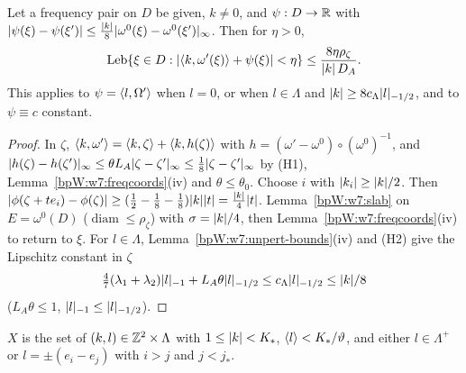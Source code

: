 \begin{lemma}\label{bpW:w7:zone}
Let a frequency pair on $D$ be given, $k\ne0$, and $\psi:D\to\mathbb{R}$ with
$\lvert \psi(\xi)-\psi(\xi')\rvert\le\frac{\lvert k\rvert}8\lvert \omega^0(\xi)-\omega^0(\xi')\rvert_\infty$. Then for $\eta>0$,
\[\operatorname{Leb}\{\xi\in D:\lvert \langle k,\omega'(\xi)\rangle+\psi(\xi)\rvert<\eta\}\le\frac{8\eta\rho_\zeta}{\lvert k\rvert\,D_A}.\]
This applies to $\psi=\langle l,\Omega'\rangle$ when $l=0$, or when $l\in\Lambda$ and $\lvert k\rvert\ge8c_\Lambda\lvert l\rvert_{-1/2}$, and to
$\psi\equiv c$ constant.
\end{lemma}
\begin{proof}
\label{stepW:w7:zone-lower}
In $\zeta$, $\langle k,\omega'\rangle=\langle k,\zeta\rangle+\langle k,h(\zeta)\rangle$ with $h=(\omega'-\omega^0)\circ(\omega^0)^{-1}$, and
$\lvert h(\zeta)-h(\zeta')\rvert_\infty\le\theta L_A\lvert \zeta-\zeta'\rvert_\infty\le\frac18\lvert \zeta-\zeta'\rvert_\infty$ by (H1),
Lemma~\ref{bpW:w7:freqcoords}(iv) and $\theta\le\theta_0$. Choose $i$ with $\lvert k_i\rvert\ge\lvert k\rvert/2$. Then
$\lvert \phi(\zeta+te_i)-\phi(\zeta)\rvert\ge(\frac12-\frac18-\frac18)\lvert k\rvert\lvert t\rvert=\frac{\lvert k\rvert}4\lvert t\rvert$.
\label{stepW:w7:zone-slab}
Lemma~\ref{bpW:w7:slab} on $E=\omega^0(D)$ ($\operatorname{diam}\le\rho_\zeta$) with $\sigma=\lvert k\rvert/4$, then
Lemma~\ref{bpW:w7:freqcoords}(iv) to return to $\xi$.
\label{stepW:w7:zone-psi}
For $l\in\Lambda$, Lemma~\ref{bpW:w7:unpert-bounds}(iv) and (H2) give the Lipschitz constant in $\zeta$
\[\tfrac47(\lambda_1+\lambda_2)\lvert l\rvert_{-1}+L_A\theta\lvert l\rvert_{-1/2}\le c_\Lambda\lvert l\rvert_{-1/2}\le\lvert k\rvert/8\]
($L_A\theta\le1$, $\lvert l\rvert_{-1}\le\lvert l\rvert_{-1/2}$).
\end{proof}

\begin{definition}\label{bpW:w7:Xdef}
$X$ is the set of $(k,l)\in\mathbb{Z}^2\times\Lambda$ with $1\le\lvert k\rvert<K_*$, $\langle l\rangle<K_*/\vartheta$, and either
$l\in\Lambda^+$ or $l=\pm(e_i-e_j)$ with $i>j$ and $j<j_*$.
\end{definition}

